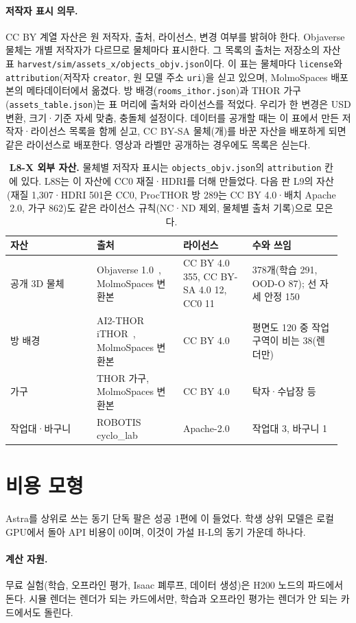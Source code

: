 \paragraph{저작자 표시 의무.} CC BY 계열 자산은 원 저작자, 출처, 라이선스, 변경 여부를 밝혀야 한다. Objaverse 물체는 개별 저작자가 다르므로 물체마다 표시한다. 그 목록의 출처는 저장소의 자산 표 \texttt{harvest/sim/assets\_x/objects\_objv.json}이다. 이 표는 물체마다 \texttt{license}와 \texttt{attribution}(저작자 \texttt{creator}, 원 모델 주소 \texttt{uri})을 싣고 있으며, MolmoSpaces 배포본의 메타데이터에서 옮겼다. 방 배경(\texttt{rooms\_ithor.json})과 THOR 가구(\texttt{assets\_table.json})는 표 머리에 출처와 라이선스를 적었다. 우리가 한 변경은 USD 변환, 크기·기준 자세 맞춤, 충돌체 설정이다. 데이터를 공개할 때는 이 표에서 만든 저작자·라이선스 목록을 함께 싣고, CC BY-SA 물체(개)를 바꾼 자산을 배포하게 되면 같은 라이선스로 배포한다. 영상과 라벨만 공개하는 경우에도 목록은 싣는다.

\begin{table}[t]
\centering
\scriptsize
\setlength{\tabcolsep}{2pt}
\begin{tabular}{@{}p{0.25\linewidth}p{0.25\linewidth}p{0.20\linewidth}p{0.26\linewidth}@{}}
\toprule
자산 & 출처 & 라이선스 & 수와 쓰임 \\
\midrule
공개 3D 물체 & Objaverse 1.0~\cite{objaverse2023}, MolmoSpaces 변환본 & CC BY 4.0 355, CC BY-SA 4.0 12, CC0 11 & 378개(학습 291, OOD-O 87); 선 자세 안정 150 \\
방 배경 & AI2-THOR iTHOR~\cite{ai2thor2017}, MolmoSpaces 변환본 & CC BY 4.0 & 평면도 120 중 작업 구역이 비는 38(렌더만) \\
가구 & THOR 가구, MolmoSpaces 변환본 & CC BY 4.0 & 탁자·수납장 등 \\
작업대·바구니 & ROBOTIS cyclo\_lab & Apache-2.0 & 작업대 3, 바구니 1 \\
\bottomrule
\end{tabular}
\caption{\textbf{L8-X 외부 자산.} 물체별 저작자 표시는 \texttt{objects\_objv.json}의 \texttt{attribution} 칸에 있다. L8S는 이 자산에 CC0 재질·HDRI를 더해 만들었다. 다음 판 L9의 자산(재질 1,307·HDRI 501은 CC0, ProcTHOR 방 289는 CC BY 4.0·배치 Apache 2.0, 가구 862)도 같은 라이선스 규칙(NC·ND 제외, 물체별 출처 기록)으로 모은다.}
\label{tab:supp_assets}
\end{table}

\section{비용 모형}
\label{sec:supp_cost}
Astra를 상위로 쓰는 동기 단독 팔은 성공 1편에 이 들었다. 학생 상위 모델은 로컬 GPU에서 돌아 API 비용이 0이며, 이것이 가설 H-L의 동기 가운데 하나다.

\paragraph{계산 자원.} 무료 실험(학습, 오프라인 평가, Isaac 폐루프, 데이터 생성)은 H200 노드의 파드에서 돈다. 시뮬 렌더는 렌더가 되는 카드에서만, 학습과 오프라인 평가는 렌더가 안 되는 카드에서도 돌린다.
